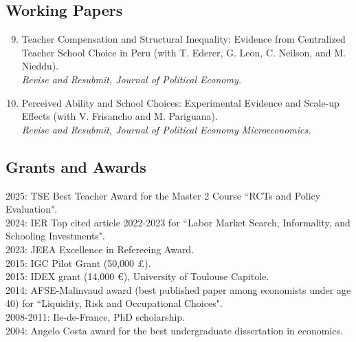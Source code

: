 \documentclass[12pt,english]{article}
\begin{document}
\subsection*{Working Papers}
\begin{enumerate}
\setcounter{enumi}{8}


\item Teacher Compensation and Structural Inequality: Evidence from Centralized Teacher School Choice in Peru (with T. Ederer, G. Leon, C. Neilson, and M. Nieddu).
\\
\textit{Revise and Resubmit, Journal of Political Economy.}
\item Perceived Ability and School Choices: Experimental Evidence and Scale-up Effects (with V. Frisancho and M. Pariguana).  
\\
\textit{Revise and Resubmit, Journal of Political Economy Microeconomics.}

\end{enumerate}

\subsection*{Grants and Awards}
2025: TSE Best Teacher Award for the Master 2 Course ``RCTs and Policy Evaluation".\vspace{0.2cm} \\
2024: IER Top cited article 2022-2023 for ``Labor Market Search, Informality, and Schooling Investments".\vspace{0.2cm} \\
2023: JEEA Excellence in Refereeing Award.\vspace{0.2cm} \\
2015: IGC Pilot Grant (50,000 \pounds). \vspace{0.2cm} \\
2015: IDEX grant (14,000 \euro), University of Toulouse Capitole. \vspace{0.2cm} \\
2014: AFSE-Malinvaud award (best published paper among economists under age 40) for ``Liquidity, Risk and Occupational Choices". \vspace{0.2cm}\\
2008-2011: Ile-de-France, PhD scholarship. \vspace{0.2cm}\\
2004: Angelo Costa award for the best undergraduate dissertation in economics. 
\end{document}

